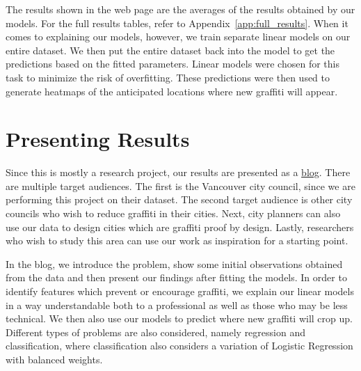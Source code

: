 The results shown in the web page are the averages of the results obtained by our models. For the full results tables, refer to Appendix~\ref{app:full_results}. When it comes to explaining our models, however, we train separate linear models on our entire dataset. We then put the entire dataset back into the model to get the predictions based on the fitted parameters. Linear models were chosen for this task to minimize the risk of overfitting. These predictions were then used to generate heatmaps of the anticipated locations where new graffiti will appear.

\section{Presenting Results}

Since this is mostly a research project, our results are presented as a \href{https://cowkeyman.github.io/PredictingGraffitiUsingCityLayouts/}{blog}. There are multiple target audiences. The first is the Vancouver city council, since we are performing this project on their dataset. The second target audience is other city councils who wish to reduce graffiti in their cities. Next, city planners can also use our data to design cities which are graffiti proof by design. Lastly, researchers who wish to study this area can use our work as inspiration for a starting point.

In the blog, we introduce the problem, show some initial observations obtained from the data and then present our findings after fitting the models. In order to identify features which prevent or encourage graffiti, we explain our linear models in a way understandable both to a professional as well as those who may be less technical. We then also use our models to predict where new graffiti will crop up. Different types of problems are also considered, namely regression and classification, where classification also considers a variation of Logistic Regression with balanced weights.
